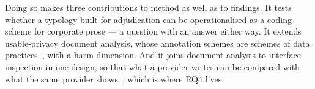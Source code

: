 Doing so makes three contributions to method as well as to findings. It tests
whether a typology built for adjudication can be operationalised as a coding
scheme for corporate prose --- a question with an answer either way. It extends
usable-privacy document analysis, whose annotation schemes are schemes of data
practices~\parencite{wilson2016creation,harkous2018polisis}, with a harm
dimension. And it joins document analysis to interface inspection in one design,
so that what a provider writes can be compared with what the same provider
shows~\parencite{wharton1994cognitive}, which is where RQ4 lives.
